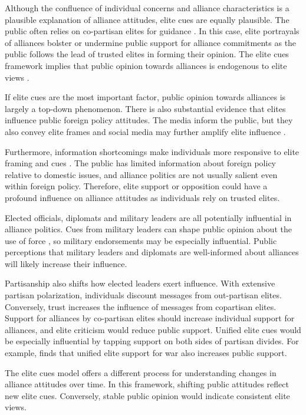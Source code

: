 \documentclass[12pt]{article}
\begin{document}
Although the confluence of individual concerns and alliance characteristics is a plausible explanation of alliance attitudes, elite cues are equally plausible. 
The public often relies on co-partisan elites for guidance \citep{Druckmanetal2013}. 
In this case, elite portrayals of alliances bolster or undermine public support for alliance commitments as the public follows the lead of trusted elites in forming their opinion. 
The elite cues framework implies that public opinion towards alliances is endogenous to elite views \citep{Druckman2014}.


If elite cues are the most important factor, public opinion towards alliances is largely a top-down phenomenon.
There is also substantial evidence that elites influence public foreign policy attitudes. 
The media inform the public, but they also convey elite frames \citep{BaumPotter2008} and social media may further amplify elite influence \citep{BaumPotter2019}.   


Furthermore, information shortcomings make individuals more responsive to elite framing and cues \citep{Druckman2001, Peterson2017}.  
The public has limited information about foreign policy relative to domestic issues, and alliance politics are not usually salient even within foreign policy. 
Therefore, elite support or opposition could have a profound influence on alliance attitudes as individuals rely on trusted elites. 


Elected officials, diplomats and military leaders are all potentially influential in alliance politics. 
Cues from military leaders can shape public opinion about the use of force \citep{Golbyetal2018}, so military endorsements may be especially influential. 
Public perceptions that military leaders and diplomats are well-informed about alliances will likely increase their influence. 


Partisanship also shifts how elected leaders exert influence.
With extensive partisan polarization, individuals discount messages from out-partisan elites. 
Conversely, trust increases the influence of messages from copartisan elites. 
Support for alliances by co-partisan elites should increase individual support for alliances, and elite criticism would reduce public support.  
Unified elite cues would be especially influential by tapping support on both sides of partisan divides.
For example, \citet{Berinsky2007} finds that unified elite support for war also increases public support. 


The elite cues model offers a different process for understanding changes in alliance attitudes over time. 
In this framework, shifting public attitudes reflect new elite cues. 
Conversely, stable public opinion would indicate consistent elite views. 
\end{document}
